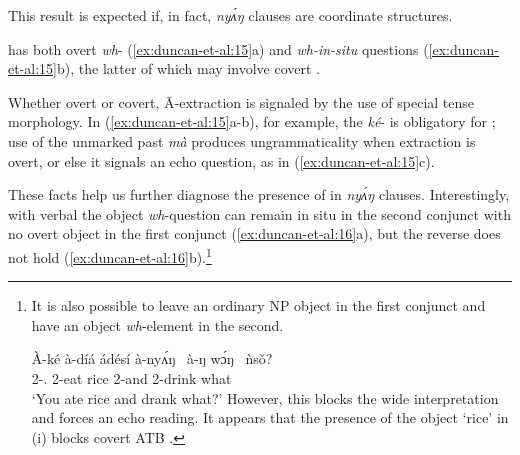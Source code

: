 \documentclass[output=paper,modfonts,nonflat,
hidelinks
]{langsci/langscibook}
\begin{document}
\noindent This result is expected if, in fact, \textit{ny\'{ʌ}ŋ} clauses are coordinate structures.

 has both overt \textit{wh}- (\ref{ex:duncan-et-al:15}a) and \textit{wh-in-situ} questions (\ref{ex:duncan-et-al:15}b), the latter of which may involve covert .

\ea\label{ex:duncan-et-al:15}
\z
\z

\noindent Whether overt or covert, \={A}-extraction is signaled by the use of special  tense morphology. In (\ref{ex:duncan-et-al:15}a-b), for example, the  \textit{ké}- is obligatory for ; use of the unmarked past  \textit{mà} produces ungrammaticality when extraction is overt, or else it signals an echo question, as in (\ref{ex:duncan-et-al:15}c).

These facts help us further diagnose the presence of  in \textit{ny\'{ʌ}ŋ} clauses. Interestingly, with verbal  the object \textit{wh}-question can remain {in situ} in the second conjunct with no overt object in the first conjunct (\ref{ex:duncan-et-al:16}a), but the reverse does not hold (\ref{ex:duncan-et-al:16}b).\footnote{It is also possible to leave an ordinary NP object in the first conjunct and have an object \textit{wh}-element in the second.

\ea\label{ex:duncan-et-al:i}
\gll \`{A}-ké à-díá ádésí à-ny\'{ʌ}ŋ~ à-ŋ w\'ɔŋ~ ǹs\v{o}? \\
2{\SG-\PST.\FOC} 2{\SG}-eat rice 2{\SG}-and 2{\SG}-drink what \\
\glt `You ate rice and drank what?'
\z
However, this blocks the wide  interpretation and forces an echo reading. It appears that the presence of the object `rice' in (i) blocks covert ATB .}

\ea\label{ex:duncan-et-al:16}
\z
\z
\end{document}
